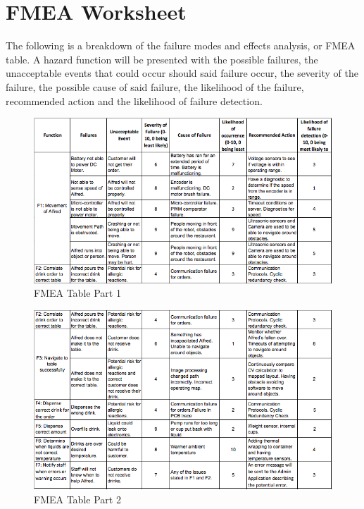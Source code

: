 \documentclass [10pt]{article}
\begin{document}
\pagebreak


\section{FMEA Worksheet}

The following is a breakdown of the failure modes and effects analysis, or FMEA table. A hazard function will be presented with the possible failures, the unacceptable events that could occur should said failure occur, the severity of the failure, the possible cause of said failure, the likelihood of the failure, recommended action and the likelihood of failure detection.

\begin{figure} [h!]
	\centering
	\includegraphics [scale = 0.7] {figures/FMEA_1.png}
	\caption{FMEA Table Part 1}
\end{figure}

\begin{figure} [h!]
	\centering
	\includegraphics [scale = 0.7] {figures/FMEA_2.png}
	\caption{FMEA Table Part 2}
\end{figure}
\end{document}
